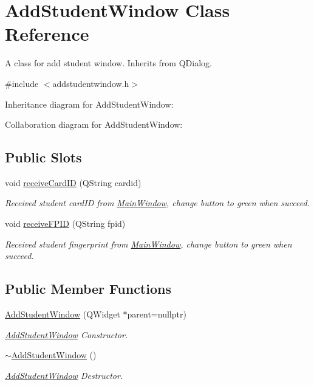 \hypertarget{class_add_student_window}{}\section{Add\+Student\+Window Class Reference}
\label{class_add_student_window}


A class for add student window. Inherits from Q\+Dialog.  




{\ttfamily \#include $<$addstudentwindow.\+h$>$}



Inheritance diagram for Add\+Student\+Window\+:


Collaboration diagram for Add\+Student\+Window\+:
\subsection*{Public Slots}
\begin{DoxyCompactItemize}
\item 
void \hyperlink{class_add_student_window_a490e2551e9c9e2ef1c30b5ec6ae9da46}{receive\+Card\+I\+D} (Q\+String cardid)
\begin{DoxyCompactList}\small\item\em Received student card\+I\+D from \hyperlink{class_main_window}{Main\+Window}, change button to green when succeed. \end{DoxyCompactList}\item 
void \hyperlink{class_add_student_window_aa609ee6902208d9711365e0e6c390654}{receive\+F\+P\+I\+D} (Q\+String fpid)
\begin{DoxyCompactList}\small\item\em Received student fingerprint from \hyperlink{class_main_window}{Main\+Window}, change button to green when succeed. \end{DoxyCompactList}\end{DoxyCompactItemize}
\subsection*{Public Member Functions}
\begin{DoxyCompactItemize}
\item 
\hyperlink{class_add_student_window_a9b1648c23f475584aa17a421eac88ba3}{Add\+Student\+Window} (Q\+Widget $\ast$parent=nullptr)
\begin{DoxyCompactList}\small\item\em \hyperlink{class_add_student_window}{Add\+Student\+Window} Constructor. \end{DoxyCompactList}\item 
\hyperlink{class_add_student_window_ae1a1934b001bdd8ffd596f22f3f2adc5}{$\sim$\+Add\+Student\+Window} ()
\begin{DoxyCompactList}\small\item\em \hyperlink{class_add_student_window}{Add\+Student\+Window} Destructor. \end{DoxyCompactList}\end{DoxyCompactItemize}
